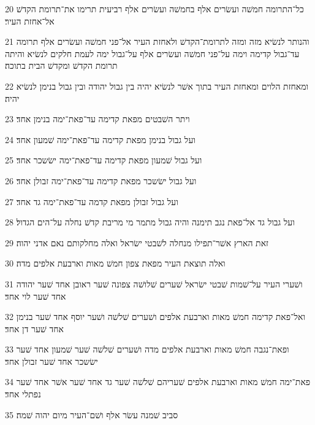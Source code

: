 \par 20 כל־התרומה חמשׁה ועשׂרים אלף בחמשׁה ועשׂרים אלף רביעית תרימו את־תרומת הקדשׁ אל־אחזת העיר׃
\par 21 והנותר לנשׂיא מזה ומזה לתרומת־הקדשׁ ולאחזת העיר אל־פני חמשׁה ועשׂרים אלף תרומה עד־גבול קדימה וימה על־פני חמשׁה ועשׂרים אלף על־גבול ימה לעמת חלקים לנשׂיא והיתה תרומת הקדשׁ ומקדשׁ הבית בתוכה׃
\par 22 ומאחזת הלוים ומאחזת העיר בתוך אשׁר לנשׂיא יהיה בין גבול יהודה ובין גבול בנימן לנשׂיא יהיה׃
\par 23 ויתר השׁבטים מפאת קדימה עד־פאת־ימה בנימן אחד׃
\par 24 ועל גבול בנימן מפאת קדימה עד־פאת־ימה שׁמעון אחד׃
\par 25 ועל גבול שׁמעון מפאת קדימה עד־פאת־ימה ישׂשכר אחד׃
\par 26 ועל גבול ישׂשכר מפאת קדימה עד־פאת־ימה זבולן אחד׃
\par 27 ועל גבול זבולן מפאת קדמה עד־פאת־ימה גד אחד׃
\par 28 ועל גבול גד אל־פאת נגב תימנה והיה גבול מתמר מי מריבת קדשׁ נחלה על־הים הגדול׃
\par 29 זאת הארץ אשׁר־תפילו מנחלה לשׁבטי ישׂראל ואלה מחלקותם נאם אדני יהוה׃
\par 30 ואלה תוצאת העיר מפאת צפון חמשׁ מאות וארבעת אלפים מדה׃
\par 31 ושׁערי העיר על־שׁמות שׁבטי ישׂראל שׁערים שׁלושׁה צפונה שׁער ראובן אחד שׁער יהודה אחד שׁער לוי אחד׃
\par 32 ואל־פאת קדימה חמשׁ מאות וארבעת אלפים ושׁערים שׁלשׁה ושׁער יוסף אחד שׁער בנימן אחד שׁער דן אחד׃
\par 33 ופאת־נגבה חמשׁ מאות וארבעת אלפים מדה ושׁערים שׁלשׁה שׁער שׁמעון אחד שׁער ישׂשכר אחד שׁער זבולן אחד׃
\par 34 פאת־ימה חמשׁ מאות וארבעת אלפים שׁעריהם שׁלשׁה שׁער גד אחד שׁער אשׁר אחד שׁער נפתלי אחד׃
\par 35 סביב שׁמנה עשׂר אלף ושׁם־העיר מיום יהוה שׁמה׃


